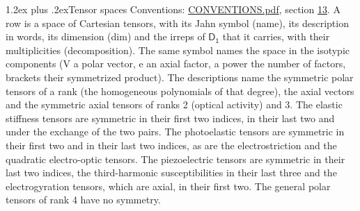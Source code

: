 \documentclass[10pt,a4paper]{article}
\makeatletter
\renewcommand\section{\@startsection{section}{1}{\z@}{-3ex plus -1ex minus -.2ex}%
  {1.2ex plus .2ex}{\normalfont\large\sffamily\bfseries\color{parttitle}}}
\numberwithin{equation}{section}
\newcommand{\grp}[1]{\mathsf{#1}}
\makeatother
\begin{document}
\section{Tensor spaces}\label{s:tensor_spaces}
Conventions: \href{../../CONVENTIONS.pdf}{CONVENTIONS.pdf}, section \href{../../CONVENTIONS.pdf\#conv.13}{13}.
\leavevmode\label{n:head.name}\label{n:head.description}\label{n:head.dim}\label{n:head.decomposition}A row is a space of Cartesian tensors, with its Jahn symbol (name), its description in words, its dimension (dim) and the irreps of $\grp{D_{1}}$ that it carries, with their multiplicities (decomposition). \label{n:label.jahn}The same symbol names the space in the isotypic components (V a polar vector, e an axial factor, a power the number of factors, brackets their symmetrized product). The descriptions name the symmetric polar tensors of a rank (the homogeneous polynomials of that degree), the axial vectors and the symmetric axial tensors of ranks 2 (optical activity) and 3. The elastic stiffness tensors are symmetric in their first two indices, in their last two and under the exchange of the two pairs. The photoelastic tensors are symmetric in their first two and in their last two indices, as are the electrostriction and the quadratic electro-optic tensors. The piezoelectric tensors are symmetric in their last two indices, the third-harmonic susceptibilities in their last three and the electrogyration tensors, which are axial, in their first two. The general polar tensors of rank 4 have no symmetry.
\end{document}
